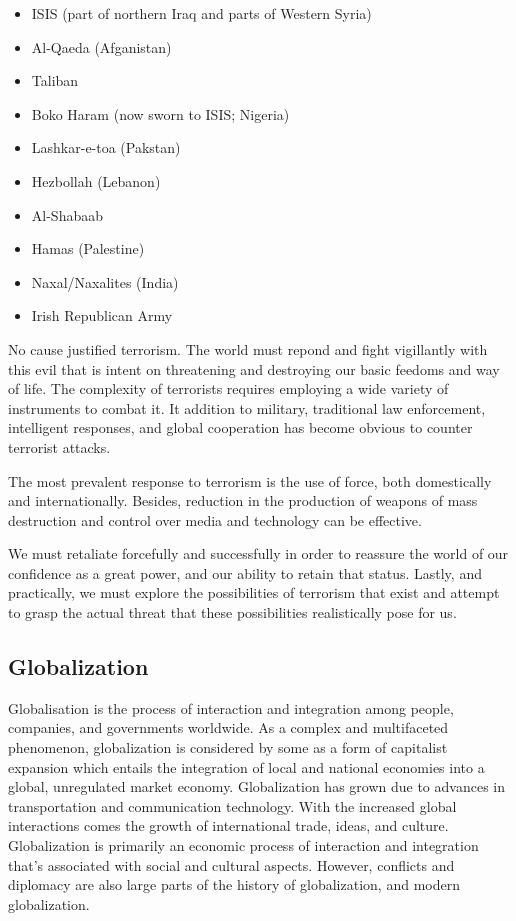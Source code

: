 \documentclass[
  openany]{book}
\providecommand{\tightlist}{%
  \setlength{\itemsep}{0pt}\setlength{\parskip}{0pt}}
\begin{document}
\begin{itemize}
\tightlist
\item
  ISIS (part of northern Iraq and parts of Western Syria)
\item
  Al-Qaeda (Afganistan)
\item
  Taliban
\item
  Boko Haram (now sworn to ISIS; Nigeria)
\item
  Lashkar-e-toa (Pakstan)
\item
  Hezbollah (Lebanon)
\item
  Al-Shabaab
\item
  Hamas (Palestine)
\item
  Naxal/Naxalites (India)
\item
  Irish Republican Army
\end{itemize}

No cause justified terrorism. The world must repond and fight vigillantly with this evil that is intent on threatening and destroying our basic feedoms and way of life. The complexity of terrorists requires employing a wide variety of instruments to combat it. It addition to military, traditional law enforcement, intelligent responses, and global cooperation has become obvious to counter terrorist attacks.

The most prevalent response to terrorism is the use of force, both domestically and internationally. Besides, reduction in the production of weapons of mass destruction and control over media and technology can be effective.

We must retaliate forcefully and successfully in order to reassure the world of our confidence as a great power, and our ability to retain that status. Lastly, and practically, we must explore the possibilities of terrorism that exist and attempt to grasp the actual threat that these possibilities realistically pose for us.

\hypertarget{globalization}{%
\subsection{Globalization}\label{globalization}}

Globalisation is the process of interaction and integration among people, companies, and governments worldwide. As a complex and multifaceted phenomenon, globalization is considered by some as a form of capitalist expansion which entails the integration of local and national economies into a global, unregulated market economy. Globalization has grown due to advances in transportation and communication technology. With the increased global interactions comes the growth of international trade, ideas, and culture. Globalization is primarily an economic process of interaction and integration that's associated with social and cultural aspects. However, conflicts and diplomacy are also large parts of the history of globalization, and modern globalization.
\end{document}
